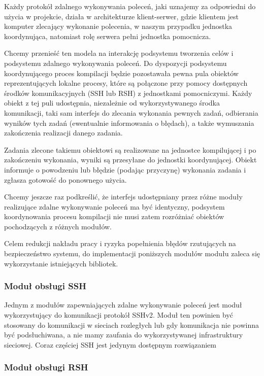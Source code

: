 \documentclass[a4paper]{article}
\begin{document}
Każdy protokół zdalnego wykonywania poleceń, jaki uznajemy za odpowiedni do użycia w projekcie, działa w architekturze klient-serwer, gdzie klientem jest komputer zlecający wykonanie polecenia, w naszym przypadku jednostka koordynująca, natomiast rolę serwera pełni jednostka pomocnicza.

Chcemy przenieść ten modela na interakcję podsystemu tworzenia celów i podsystemu zdalnego wykonywania poleceń.
Do dyspozycji podsystemu koordynującego proces kompilacji będzie pozostawała pewna pula obiektów reprezentujących lokalne procesy, które są połączone przy pomocy dostępnych środków komunikacyjnych (SSH lub RSH) z jednostkami pomocniczymi.
Każdy obiekt z tej puli udostępnia, niezależnie od wykorzystywanego środka komunikacji, taki sam interfejs do zlecania wykonania pewnych zadań, odbierania wyników tych zadań (ewentualnie informowania o błędach), a także wymuszania zakończenia realizacji danego zadania.

Zadania zlecone takiemu obiektowi są realizowane na jednostce kompilującej i po zakończeniu wykonania, wyniki są przesyłane do jednostki koordynującej.
Obiekt informuje o powodzeniu lub błędzie (podając przyczynę) wykonania zadania i zgłasza gotowość do ponownego użycia.

Chcemy jeszcze raz podkreślić, że interfejs udostępniany przez różne moduły realizujące zdalne wykonywanie poleceń ma być identyczny, podsystem koordynowania procesu kompilacji nie musi zatem rozróżniać obiektów pochodzących z różnych modułów.

Celem redukcji nakładu pracy i ryzyka popełnienia błędów rzutujących na bezpieczeństwo systemu, do implementacji poniższych modułów modułu zaleca się wykorzystanie istniejących bibliotek.

\subsubsection{Moduł obsługi SSH}

Jednym z modułów zapewniających zdalne wykonywanie poleceń jest moduł wykorzystujący do komunikacji protokół SSHv2.
Moduł ten powinien być stosowany do komunikacji w sieciach rozległych lub gdy komunikacja nie powinna być podsłuchiwana, a nie mamy zaufania do wykorzystywanej infrastruktury sieciowej.
Coraz częściej SSH jest jedynym dostępnym rozwiązaniem 

\subsubsection{Moduł obsługi RSH}
\end{document}

